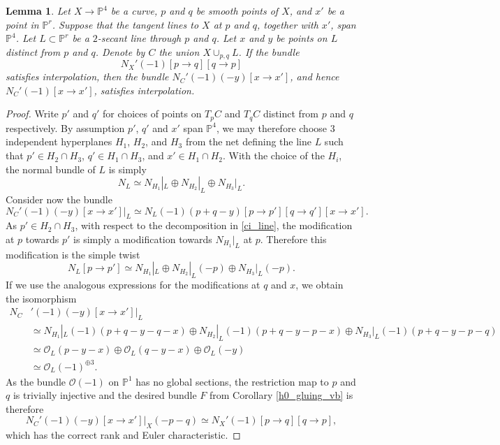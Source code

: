 \documentclass[11pt]{amsart}
\newcommand{\pp}{\mathbb{P}}
\renewcommand{\O}{\mathcal{O}}
\newtheorem{lem}[thm]{Lemma}
\theoremstyle{definition}
\theoremstyle{remark}
\begin{document}
\begin{lem}\label{2-secant-easy}
Let $X \to \pp^4$ be a curve, $p$ and $q$ be smooth points of $X$, and $x'$ be a point in $\pp^r$.
Suppose that the tangent lines to $X$ at $p$ and $q$, together with $x'$,
span $\pp^4$.
Let $L \subset \pp^r$ be a $2$-secant line through $p$ and $q$.  Let $x$ and $y$ be points on $L$ distinct from $p$ and $q$.  Denote by $C$ the union $X \cup_{p,q} L$.   If the bundle
\[N_X'(-1)[p \to q][q\to p] \]
satisfies interpolation, then the bundle $N_C'(-1)(-y)[x \to x']$, and hence $N_C'(-1)[x \to x']$, satisfies interpolation.
\end{lem}
\begin{proof}
Write $p'$ and $q'$ for choices of points on $T_p C$ and $T_q C$
distinct from $p$ and $q$ respectively.  By assumption $p'$, $q'$ and $x'$ span $\pp^4$, we may therefore choose $3$ independent hyperplanes $H_1$, $H_2$, and $H_3$ from the net defining the line $L$ such that $p' \in H_2 \cap H_3$, $q' \in H_1 \cap H_3$, and $x' \in H_1 \cap H_2$.  With the choice of the $H_i$, the normal bundle of $L$ is simply
\begin{equation}\label{ci_line} N_L \simeq N_{H_1}|_L \oplus N_{H_2}|_L \oplus N_{H_3}|_L. \end{equation}
Consider now the bundle
\[N_C'(-1)(-y)[x \to x']|_L
\simeq N_L(-1)(p+q-y)[p \to p'][q \to q'][x \to x']. \]
As $p' \in H_2 \cap H_3$, with respect to the decomposition in \eqref{ci_line}, the modification at $p$ towards $p'$ is simply a modification towards $N_{H_1}|_L$ at $p$.  Therefore this modification is the simple twist
\[N_L[p \to p'] \simeq N_{H_1}|_L \oplus N_{H_2}|_L(-p) \oplus N_{H_3}|_L(-p). \]
If we use the analogous expressions for the modifications at $q$ and $x$, we obtain the isomorphism
\begin{align*}
N_C&'(-1)(-y)[x \to x']|_L \\
&\simeq N_{H_1}|_L(-1)(p+q-y -q-x) \oplus N_{H_2}|_L(-1)(p+q-y-p-x) \oplus N_{H_3}|_L(-1)(p+q-y-p-q) \\
& \simeq \O_L(p-y -x) \oplus \O_L(q-y-x) \oplus \O_L(-y) \\
& \simeq \O_L(-1)^{\oplus 3}.
\end{align*}
As the bundle $\O(-1)$ on $\pp^1$ has no global sections, the restriction map to $p$ and $q$ is trivially injective and the desired bundle $F$ from Corollary \ref{h0_gluing_vb} is therefore
\[N_C'(-1)(-y)[x \to x']|_X (-p-q) \simeq N_X'(-1)[p \to q][q \to p], \]
which has the correct rank and Euler characteristic.
\end{proof}
\end{document}
